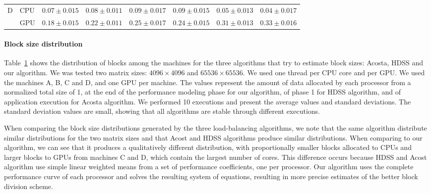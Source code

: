 \documentclass[journal]{IEEEtran}
\begin{document}
\begin{table}[htb]
\begin{scriptsize}
\begin{tabular}{|l|l|l|l|l|l|l|l|}
\hline
D & CPU & \multicolumn{1}{c|}{$0.07 \pm 0.015$} & \multicolumn{1}{c|}{$0.08 \pm 0.011$} & \multicolumn{1}{c|}{$0.09 \pm 0.017$} & \multicolumn{1}{c|}{$0.09 \pm 0.015$} & \multicolumn{1}{c|}{$0.05 \pm 0.013$} & \multicolumn{1}{c|}{$0.04 \pm 0.017$} \\ 
\cline{2-8}
 & GPU & \multicolumn{1}{c|}{$0.18 \pm 0.015$} & \multicolumn{1}{c|}{$0.22 \pm 0.011$} & \multicolumn{1}{c|}{$0.25 \pm 0.017$} & \multicolumn{1}{c|}{$0.24 \pm 0.015$} & \multicolumn{1}{c|}{$0.31 \pm 0.013$} & \multicolumn{1}{c|}{$0.33 \pm 0.016$} \\ 
\hline
\end{tabular}
\end{scriptsize}
\label{table: comparativoBlocos}
\end{table}

\paragraph{Block size distribution} Table~\ref{table: comparativoBlocos} shows 
the distribution of blocks among the machines for the three algorithms that try
to estimate block sizes: Acosta, HDSS and our algorithm. We was tested two
matrix sizes: $4096 \times 4096$ and $65536 \times 65536$. We used one thread
per CPU core and per GPU. We used the machines A, B, C and D, and one GPU per
machine. The values represent the amount of data allocated by each processor
from a normalized total size of 1, at the end of the performance modeling phase
for our algorithm, of phase 1 for HDSS algorithm, and of application execution
for Acosta algorithm. We performed 10 executions and present the average values
and standard deviations. The standard deviation values are small, showing that
all algorithms are stable through different executions.

When comparing the block size distributions generated by the three
load-balancing algorithms, we note that the same algorithm distribute similar
distributions for the two matrix sizes and that Acost and HDSS algorithms
produce similar distributions. When comparing to our algorithm, we can see that
it produces a qualitatively different distribution, with proportionally smaller
blocks allocated to CPUs and larger blocks to GPUs from machines C and D, which
contain the largest number of cores. This difference occurs because HDSS and
Acost algorithm use simple linear weighted means from a set of performance
coefficients, one per processor. Our algorithm uses the complete performance
curve of each processor and solves the resulting system of equations, resulting
in more precise estimates of the better block division scheme.
\end{document}
